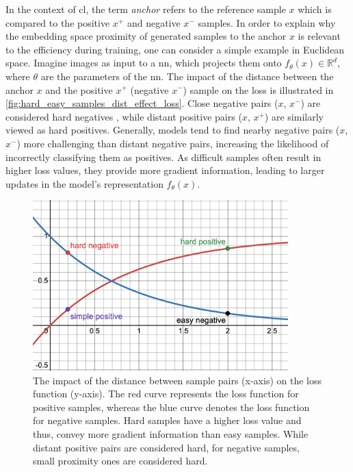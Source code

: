 In the context of \ac{cl}, the term \textit{anchor} refers to the reference sample $x$ 
which is compared to the positive $x^+$ and negative $x^-$ samples.
In order to explain why the embedding space proximity of generated samples to the anchor $x$ 
is relevant to the efficiency during training, 
one can consider a simple example in Euclidean space.
Imagine images as input to a \ac{nn}, which projects them onto $f_{\theta}(x) \in \mathbb{R}^d$, 
where $\theta$ are the parameters of the \ac{nn}.
The impact of the distance between the anchor $x$ and the positive $x^+$ (negative $x^-$) 
sample on the loss is illustrated in \autoref{fig:hard_easy_samples_dist_effect_loss}.
Close negative pairs ($x$, $x^-$) are considered hard negatives \citet{robinson_contrastive_2021}, 
while distant positive pairs ($x$, $x^+$) are similarly viewed as hard positives.
Generally, models tend to find nearby negative pairs ($x$, $x^-$) more challenging than distant negative pairs, 
increasing the likelihood of incorrectly classifying them as positives.
As difficult samples often result in higher loss values, 
they provide more gradient information, %
leading to larger updates in the model's representation $f_{\theta}(x)$.

\begin{figure}[!htb] %
    \centering
    \includegraphics[width=280pt]{images/Hard_easy_samples_dist_effect_loss_desmos.png}
    \caption{The impact of the distance between sample pairs (x-axis) on the loss function (y-axis).
    The red curve represents the loss function for positive samples, 
    whereas the blue curve denotes the loss function for negative samples.
    Hard samples have a higher loss value and thus, convey more gradient information than easy samples.
    While distant positive pairs are considered hard, for negative samples, small proximity ones are considered hard.}
    \label{fig:hard_easy_samples_dist_effect_loss}
\end{figure}